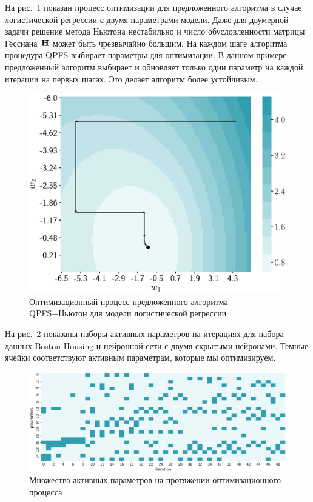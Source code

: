 На рис.~\ref{fig:irls_qpfs_2d} показан процесс оптимизации для предложенного алгоритма в случае логистической регрессии с двумя параметрами модели. 
Даже для двумерной задачи решение метода Ньютона нестабильно и число обусловленности матрицы Гессиана~$\mathbf{H}$ может быть чрезвычайно большим. 
На каждом шаге алгоритма процедура QPFS выбирает параметры для оптимизации. 
В данном примере предложенный алгоритм выбирает и обновляет только один параметр на каждой итерации на первых шагах. 
Это делает алгоритм более устойчивым.

\begin{figure}[!ht]
	\centering
	\includegraphics[width=0.6\linewidth]{figs/ch3/irls_qpfs_2d}	 
	\caption{Оптимизационный процесс предложенного алгоритма QPFS+Ньютон для модели логистической регрессии}
	\label{fig:irls_qpfs_2d}
\end{figure}

На рис.~\ref{fig:active_params_wrt_iters} показаны наборы активных параметров на итерациях для набора данных Boston Housing и нейронной сети с двумя скрытыми нейронами. 
Темные ячейки соответствуют активным параметрам, которые мы оптимизируем.

\begin{figure}[!ht]
	\centering
	\includegraphics[width=\linewidth]{figs/ch3/active_params_wrt_iters}	
	\caption{Множества активных параметров на протяжении оптимизационного процесса}
	\label{fig:active_params_wrt_iters}
\end{figure}

